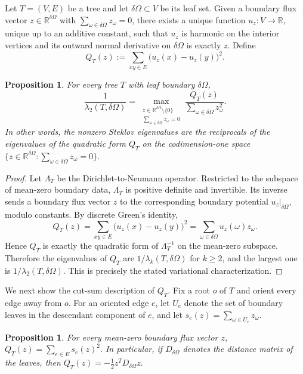 \documentclass[11pt]{article}
\newtheorem{proposition}[theorem]{Proposition}
\theoremstyle{remark}
\begin{document}
Let $T=(V,E)$ be a tree and let $\delta\Omega\subset V$ be its leaf set.
Given a boundary flux vector $z\in \mathbb{R}^{\delta\Omega}$ with $\sum_{\omega\in \delta\Omega} z_\omega =0$, there exists a unique function $u_z\colon V\to \mathbb{R}$, unique up to an additive constant,
such that $u_z$ is harmonic on the interior vertices and its outward normal derivative on
$\delta\Omega$ is exactly $z$.
Define
$$
Q_T(z):=\sum_{xy\in E}\bigl(u_z(x)-u_z(y)\bigr)^2.
$$

\begin{proposition}\label{prop:inverse-rayleigh}
For every tree $T$ with leaf boundary $\delta\Omega$,
$$
\frac1{\lambda_2(T,\delta\Omega)}
=
\max_{\substack{z\in \mathbb{R}^{\delta\Omega}\setminus\{0\}\\ \sum_{\omega\in \delta\Omega} z_\omega=0}}
\frac{Q_T(z)}{\sum_{\omega\in \delta\Omega} z_\omega^2}.
$$
In other words, the nonzero Steklov eigenvalues are the reciprocals of the eigenvalues of the
quadratic form $Q_T$ on the codimension-one space
$\{z\in\mathbb{R}^{\delta\Omega}:\sum_{\omega\in\delta\Omega} z_\omega=0\}$.
\end{proposition}

\begin{proof}
Let $\Lambda_T$ be the Dirichlet-to-Neumann operator.
Restricted to the subspace of mean-zero boundary data, $\Lambda_T$ is positive definite and
invertible.
Its inverse sends a boundary flux vector $z$ to the corresponding boundary potential
$u_z|_{\delta\Omega}$, modulo constants.
By discrete Green's identity,
$$
Q_T(z)=\sum_{xy\in E}\bigl(u_z(x)-u_z(y)\bigr)^2
=\sum_{\omega\in \delta\Omega} u_z(\omega) z_\omega.
$$
Hence $Q_T$ is exactly the quadratic form of $\Lambda_T^{-1}$ on the mean-zero subspace.
Therefore the eigenvalues of $Q_T$ are $1/\lambda_k(T,\delta\Omega)$ for $k\ge 2$, and the largest one is
$1/\lambda_2(T,\delta\Omega)$.
This is precisely the stated variational characterization.
\end{proof}

We next show the cut-sum description of $Q_T$.
Fix a root $o$ of $T$ and orient every edge away from $o$.
For an oriented edge $e$, let $U_e$ denote the set of boundary leaves in the descendant
component of $e$, and let $s_e(z)=\sum_{\omega\in U_e} z_\omega.$

\begin{proposition}\label{prop:cutsum}
For every mean-zero boundary flux vector $z$, $
Q_T(z)=\sum_{e\in E} s_e(z)^2.$
In particular, if $D_{\delta\Omega}$ denotes the distance matrix of the leaves, then
$Q_T(z)=-\frac12 z^T D_{\delta\Omega} z.$
\end{proposition}
\end{document}
